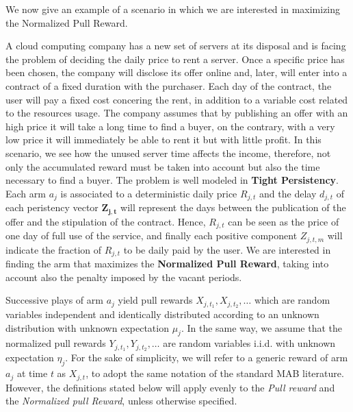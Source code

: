 We now give an example of a scenario in which we are interested in maximizing the Normalized Pull Reward.
\begin{example}
\label{cloud}
A cloud computing company has a new set of servers at its disposal and is facing the problem of deciding the daily price to rent a server. Once a specific price has been chosen, the company will disclose its offer online and, later, will enter into a contract of a fixed duration with the purchaser. Each day of the contract, the user will pay a fixed cost concering the rent, in addition to a variable cost related to the resources usage. The company assumes that by publishing an offer with an high price it will take a long time to find a buyer, on the contrary, with a very low price it will immediately be able to rent it but with little profit. In this scenario, we see how the unused server time affects the income, therefore, not only the accumulated reward must be taken into account but also the time necessary to find a buyer. The problem is well modeled in 	\textbf{Tight Persistency}. Each arm $a_j$ is associated to a deterministic daily price $R_{j,t}$ and the delay $d_{j,t}$ of each peristency vector $\boldsymbol{Z_{j,t}}$ will represent the days between the publication of the offer and the stipulation of the contract. Hence, $R_{j,t}$ can be seen as the price of one day of full use of the service, and finally each positive component $Z_{j,t,m}$ will indicate the fraction of $R_{j,t}$ to be daily paid by the user. We are interested in finding the arm that maximizes the \textbf{Normalized Pull Reward}, taking into account also the penalty imposed by the vacant periods.

\end{example}

Successive plays of arm $a_j$ yield pull rewards $X_{j,t_1}, X_{j,t_2},\dots$ which are random variables independent and identically distributed according to an unknown distribution with unknown expectation $\mu_j$.
In the same way, we assume that the normalized pull rewards $Y_{j,t_1}, Y_{j,t_2}, \dots$ are random variables i.i.d. with unknown expectation $\eta_j$. For the sake of simplicity, we will refer to a generic reward of arm $a_j$ at time $t$ as  $X_{j,t}$, to adopt the same notation of the standard MAB literature. However, the definitions stated below will apply evenly to the \emph{Pull reward} and the \emph{Normalized pull Reward}, unless otherwise specified.\\

